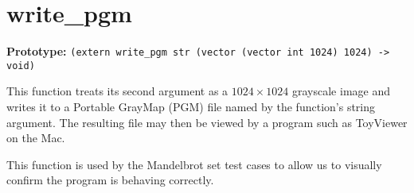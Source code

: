 \documentclass{book}
\begin{document}

\section{write\_pgm}

\textbf{Prototype:} \lstinline{(extern write_pgm str (vector (vector int 1024) 1024) -> void)}

This function treats its second argument as a $1024 \times 1024$
grayscale image and writes it to a Portable GrayMap (PGM) file named
by the function's string argument. The resulting file may then be
viewed by a program such as ToyViewer on the Mac.

This function is used by the Mandelbrot set test cases to allow us to
visually confirm the program is behaving correctly.
\end{document}
